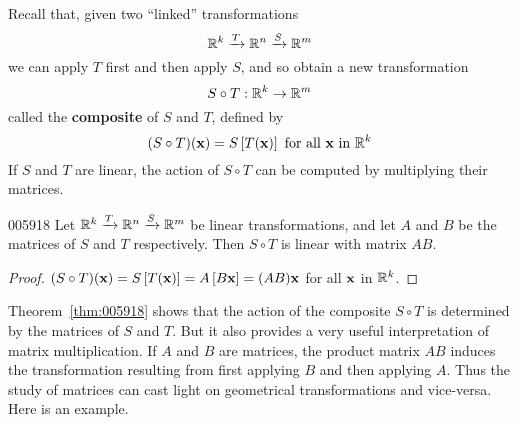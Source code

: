 Recall that, given two ``linked'' transformations
\begin{equation*}
\mathbb{R}^k \xrightarrow{T} \mathbb{R}^n \xrightarrow{S} \mathbb{R}^m
\end{equation*}
we can apply $T$ first and then apply $S$, and so obtain a new transformation
\begin{equation*}
S \circ T : \mathbb{R}^k \to \mathbb{R}^m
\end{equation*}
called the \textbf{composite} of $S$ and $T$, defined by
\begin{equation*}
(S \circ T)(\textbf{x}) = S\left[T(\textbf{x})\right] \mbox{ for all } \textbf{x} \mbox{ in } \mathbb{R}^k
\end{equation*}
If $S$ and $T$ are linear, the action of $S \circ T$ can be computed by multiplying their matrices.

\begin{theorem}{}{005918}
Let $\mathbb{R}^k \xrightarrow{T} \mathbb{R}^n \xrightarrow{S} \mathbb{R}^m$ be linear transformations, and let $A$ and $B$ be the matrices of $S$ and $T$ respectively. Then $S \circ T$ is linear with matrix $AB$.
\end{theorem}

\begin{proof}
$(S \circ T)(\textbf{x}) = S\left[T(\textbf{x})\right] = A\left[B\textbf{x}\right] = (AB)\textbf{x}$ for all $\textbf{x}$ in $\mathbb{R}^k$.
\end{proof}

Theorem~\ref{thm:005918} shows that the action of the composite $S \circ T$ is determined by the matrices of $S$ and $T$. But it also provides a very useful interpretation of matrix multiplication. If $A$ and $B$ are matrices, the product matrix $AB$ induces the transformation resulting from first applying $B$ and then applying $A$. Thus the study of matrices can cast light on geometrical transformations and vice-versa. Here is an example.

